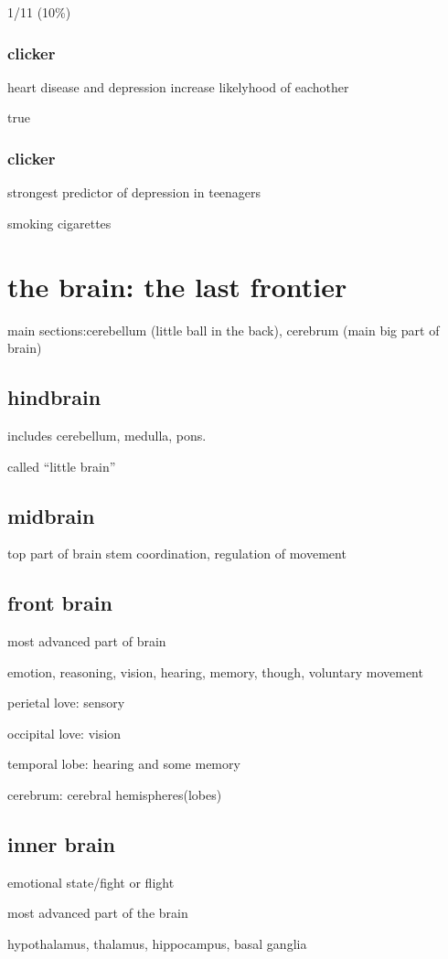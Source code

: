 \documentclass[letterpaper]{article}
\begin{document}
1/11 (10\%)
\subsubsection*{clicker}
heart disease and depression increase likelyhood of eachother

true


\subsubsection*{clicker}
strongest predictor of depression in teenagers

smoking cigarettes

\section*{the brain: the last frontier}
main sections:cerebellum (little ball in the back), cerebrum (main big part of brain)

\subsection*{hindbrain}
includes cerebellum, medulla, pons.

called ``little brain''
\subsection*{midbrain}
top part of brain stem
coordination, regulation of movement
\subsection*{front brain}
most advanced part of brain

emotion, reasoning, vision, hearing, memory, though, voluntary movement

perietal love: sensory

occipital love: vision

temporal lobe: hearing and some memory

cerebrum: cerebral hemispheres(lobes)

\subsection*{inner brain}
emotional state/fight or flight

most advanced part of the brain

hypothalamus, thalamus, hippocampus, basal ganglia
\end{document}
